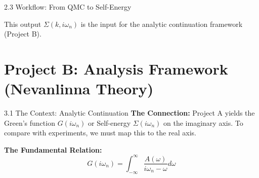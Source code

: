 \documentclass[aspectratio=169, 11pt]{beamer}
\begin{document}
\begin{frame}{2.3 Workflow: From QMC to Self-Energy}
    \centering
    
    \vspace{0.5cm}
    This output $\Sigma(k, i\omega_n)$ is the input for the analytic continuation framework (Project B).
\end{frame}

\section{Project B: Analysis Framework (Nevanlinna Theory)}

\begin{frame}{3.1 The Context: Analytic Continuation}
    \textbf{The Connection:}
    Project A yields the Green's function $G(i\omega_n)$ or Self-energy $\Sigma(i\omega_n)$ on the imaginary axis. To compare with experiments, we must map this to the real axis.

    \textbf{The Fundamental Relation:}
    \begin{equation}
        G(i\omega_n) = \int_{-\infty}^{\infty} \frac{A(\omega)}{i\omega_n - \omega} d\omega
    \end{equation}
\end{frame}
\end{document}
